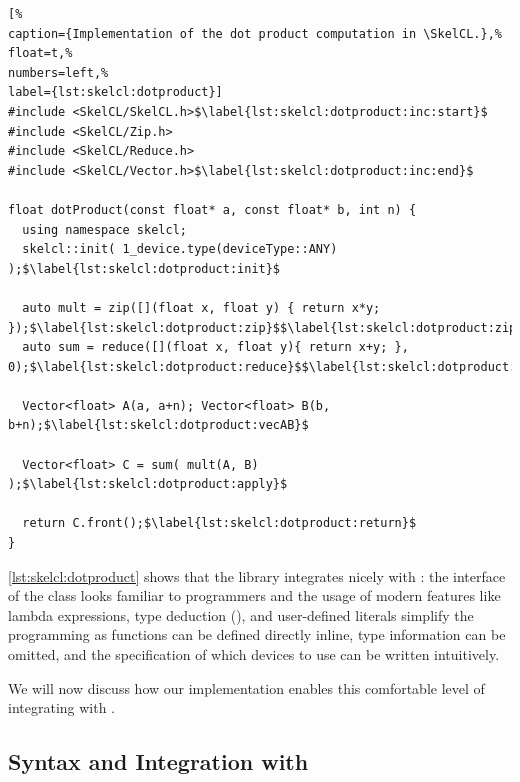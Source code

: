 \begin{lstlisting}[%                                                             
caption={Implementation of the dot product computation in \SkelCL.},%
float=t,%
numbers=left,%
label={lst:skelcl:dotproduct}]
#include <SkelCL/SkelCL.h>$\label{lst:skelcl:dotproduct:inc:start}$
#include <SkelCL/Zip.h>
#include <SkelCL/Reduce.h>
#include <SkelCL/Vector.h>$\label{lst:skelcl:dotproduct:inc:end}$

float dotProduct(const float* a, const float* b, int n) {
  using namespace skelcl;
  skelcl::init( 1_device.type(deviceType::ANY) );$\label{lst:skelcl:dotproduct:init}$

  auto mult = zip([](float x, float y) { return x*y; });$\label{lst:skelcl:dotproduct:zip}$$\label{lst:skelcl:dotproduct:zip:lambda}$
  auto sum = reduce([](float x, float y){ return x+y; }, 0);$\label{lst:skelcl:dotproduct:reduce}$$\label{lst:skelcl:dotproduct:reduce:lambda}$

  Vector<float> A(a, a+n); Vector<float> B(b, b+n);$\label{lst:skelcl:dotproduct:vecAB}$

  Vector<float> C = sum( mult(A, B) );$\label{lst:skelcl:dotproduct:apply}$

  return C.front();$\label{lst:skelcl:dotproduct:return}$
}
\end{lstlisting}

\autoref{lst:skelcl:dotproduct} shows that the \SkelCL library integrates nicely with \Cpp:
the interface of the  class looks familiar to \Cpp programmers and the usage of modern \Cpp features like lambda expressions, type deduction (), and user-defined literals simplify the programming as functions can be defined directly inline, type information can be omitted, and the specification of which devices to use can be written intuitively.

We will now discuss how our implementation enables this comfortable level of integrating \SkelCL with \Cpp.










\subsection{Syntax and Integration with \Cpp}
\label{section:skelcl-library:syntax}

